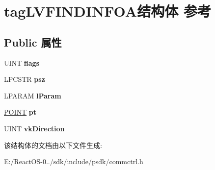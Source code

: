 \hypertarget{structtag_l_v_f_i_n_d_i_n_f_o_a}{}\section{tag\+L\+V\+F\+I\+N\+D\+I\+N\+F\+O\+A结构体 参考}
\label{structtag_l_v_f_i_n_d_i_n_f_o_a}
\subsection*{Public 属性}
\begin{DoxyCompactItemize}
\item 
\mbox{\label{structtag_l_v_f_i_n_d_i_n_f_o_a_a67d89ad1e508d18ea98cf125ff37cff1}} 
U\+I\+NT {\bfseries flags}
\item 
\mbox{\label{structtag_l_v_f_i_n_d_i_n_f_o_a_afeb26f31660f9330964cc638e67f4ca1}} 
L\+P\+C\+S\+TR {\bfseries psz}
\item 
\mbox{\label{structtag_l_v_f_i_n_d_i_n_f_o_a_aadd88f0a2c7ac1c1be27b8f31f4654f5}} 
L\+P\+A\+R\+AM {\bfseries l\+Param}
\item 
\mbox{\label{structtag_l_v_f_i_n_d_i_n_f_o_a_aaa43f946971d2e2b76b9f066948a0b03}} 
\hyperlink{structtag_p_o_i_n_t}{P\+O\+I\+NT} {\bfseries pt}
\item 
\mbox{\label{structtag_l_v_f_i_n_d_i_n_f_o_a_a219a870a4aa309c30740f1dae07e7165}} 
U\+I\+NT {\bfseries vk\+Direction}
\end{DoxyCompactItemize}


该结构体的文档由以下文件生成\+:\begin{DoxyCompactItemize}
\item 
E\+:/\+React\+O\+S-\/0../sdk/include/psdk/commctrl.\+h\end{DoxyCompactItemize}
